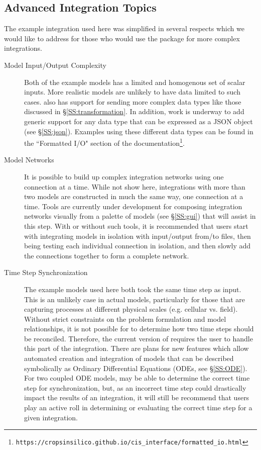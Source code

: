 \documentclass[journal]{IEEEtran}
\newcommand{\todo}[1]{{\color{red}{#1}}}
\newcommand{\pkg}{{\tt \todo{cis\_interface}}{}}
\begin{document}
\subsection{Advanced Integration Topics}
%
The example integration used here was simplified in several respects which we would like to address for those who would use the package for more complex integrations.
\begin{description}
\item[Model Input/Output Complexity] Both of the example models has a limited and homogenous set of scalar inputs. More realistic models are unlikely to have data limited to such cases. {\pkg} also has support for sending more complex data types like those discussed in \S\ref{SS:transformation}. In addition, work is underway to add generic support for any data type that can be expressed as a JSON object (see \S\ref{SS:json}). Examples using these different data types can be found in the ``Formatted I/O" section of the documentation\footnote{{\tt https://cropsinsilico.github.io/cis\_interface/formatted\_io.html}}.
\item[Model Networks] It is possible to build up complex integration networks using {\pkg} one connection at a time. While not show here, integrations with more than two models are constructed in much the same way, one connection at a time. Tools are currently under development for composing integration networks visually from a palette of models (see \S\ref{SS:gui}) that will assist in this step. With or without such tools, it is recommended that users start with integrating models in isolation with input/output from/to files, then being testing each individual connection in isolation, and then slowly add the connections together to form a complete network.
\item[Time Step Synchronization] The example models used here both took the same time step as input. This is an unlikely case in actual models, particularly for those that are capturing processes at different physical scales (e.g. cellular vs. field). Without strict constraints on the problem formulation and model relationships, it is not possible for {\pkg} to determine how two time steps should be reconciled. Therefore, the current version of {\pkg} requires the user to handle this part of the integration. There are plans for new features which allow automated creation and integration of models that can be described symbolically as Ordinary Differential Equations (ODEs, see \S\ref{SS:ODE}). For two coupled ODE models, {\pkg} may be able to determine the correct time step for synchronization, but, as an incorrect time step could drastically impact the results of an integration, it will still be recommend that users play an active roll in determining or evaluating the correct time step for a given integration.

\end{description}
\end{document}
